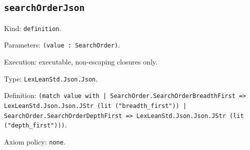\documentclass[11pt]{article}
\begin{document}
\subsection*{\texttt{searchOrderJson}}
\noindent Kind: \texttt{definition}.\par
\noindent Parameters: \texttt{(value : SearchOrder)}.\par
\noindent Execution: executable, non-escaping closures only.\par
\noindent Type: \texttt{LexLeanStd.Json.Json}.\par
\noindent Definition: \texttt{(match value with | SearchOrder.SearchOrderBreadthFirst => LexLeanStd.Json.Json.JStr (lit ("breadth\_first")) | SearchOrder.SearchOrderDepthFirst => LexLeanStd.Json.Json.JStr (lit ("depth\_first")))}.\par
\noindent Axiom policy: \texttt{none}.\par
\end{document}
